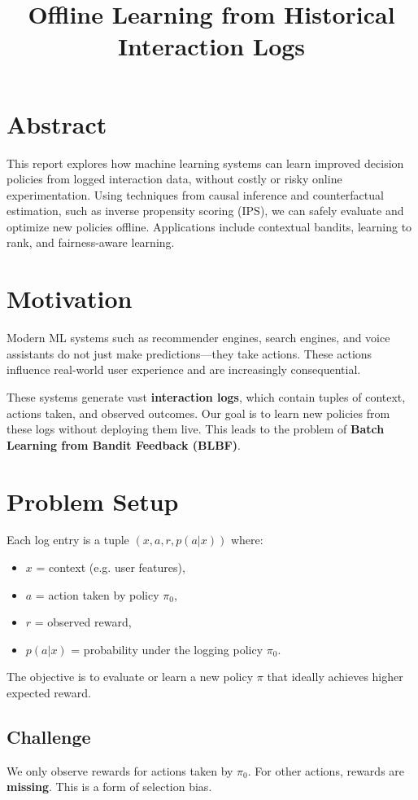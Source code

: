 \documentclass[11pt]{article}
\title{Offline Learning from Historical Interaction Logs}
\author{}
\date{}
\begin{document}
\maketitle

\section*{Abstract}
This report explores how machine learning systems can learn improved decision policies from logged interaction data, without costly or risky online experimentation. Using techniques from causal inference and counterfactual estimation, such as inverse propensity scoring (IPS), we can safely evaluate and optimize new policies offline. Applications include contextual bandits, learning to rank, and fairness-aware learning.

\section{Motivation}

Modern ML systems such as recommender engines, search engines, and voice assistants do not just make predictions---they take actions. These actions influence real-world user experience and are increasingly consequential.

These systems generate vast \textbf{interaction logs}, which contain tuples of context, actions taken, and observed outcomes. Our goal is to learn new policies from these logs without deploying them live. This leads to the problem of \textbf{Batch Learning from Bandit Feedback (BLBF)}.

\section{Problem Setup}

Each log entry is a tuple $(x, a, r, p(a|x))$ where:
\begin{itemize}
  \item $x$ = context (e.g. user features),
  \item $a$ = action taken by policy $\pi_0$,
  \item $r$ = observed reward,
  \item $p(a|x)$ = probability under the logging policy $\pi_0$.
\end{itemize}

The objective is to evaluate or learn a new policy $\pi$ that ideally achieves higher expected reward.

\subsection*{Challenge}
We only observe rewards for actions taken by $\pi_0$. For other actions, rewards are \textbf{missing}. This is a form of selection bias.
\end{document}
